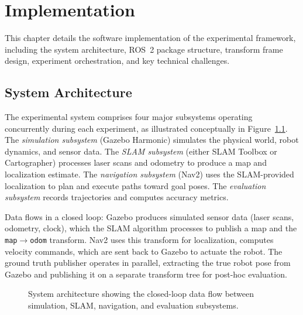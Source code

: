\chapter{Implementation}
\label{ch:implementation}

This chapter details the software implementation of the experimental framework, including the system architecture, ROS~2 package structure, transform frame design, experiment orchestration, and key technical challenges.

\section{System Architecture}

The experimental system comprises four major subsystems operating concurrently during each experiment, as illustrated conceptually in Figure~\ref{fig:system_arch}. The \emph{simulation subsystem} (Gazebo Harmonic) simulates the physical world, robot dynamics, and sensor data. The \emph{SLAM subsystem} (either SLAM Toolbox or Cartographer) processes laser scans and odometry to produce a map and localization estimate. The \emph{navigation subsystem} (Nav2) uses the SLAM-provided localization to plan and execute paths toward goal poses. The \emph{evaluation subsystem} records trajectories and computes accuracy metrics.

Data flows in a closed loop: Gazebo produces simulated sensor data (laser scans, odometry, clock), which the SLAM algorithm processes to publish a map and the \texttt{map}$\rightarrow$\texttt{odom} transform. Nav2 uses this transform for localization, computes velocity commands, which are sent back to Gazebo to actuate the robot. The ground truth publisher operates in parallel, extracting the true robot pose from Gazebo and publishing it on a separate transform tree for post-hoc evaluation.

\begin{figure}[htbp]
\centering
{}
\caption{System architecture showing the closed-loop data flow between simulation, SLAM, navigation, and evaluation subsystems.}
\label{fig:system_arch}
\end{figure}

